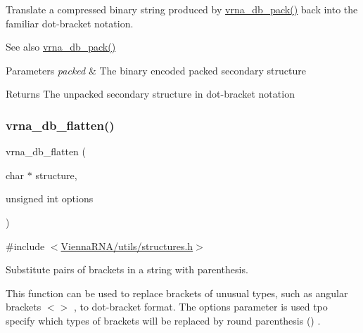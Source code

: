 Translate a compressed binary string produced by \hyperlink{group__struct__utils__dot__bracket_ga55c4783060a1464f862f858d5599c9e1}{vrna\+\_\+db\+\_\+pack()} back into the familiar dot-\/bracket notation.

\begin{DoxySeeAlso}{See also}
\hyperlink{group__struct__utils__dot__bracket_ga55c4783060a1464f862f858d5599c9e1}{vrna\+\_\+db\+\_\+pack()} 
\end{DoxySeeAlso}

\begin{DoxyParams}{Parameters}
{\em packed} & The binary encoded packed secondary structure \\
\hline
\end{DoxyParams}
\begin{DoxyReturn}{Returns}
The unpacked secondary structure in dot-\/bracket notation 
\end{DoxyReturn}
\mbox{\label{group__struct__utils__dot__bracket_gae966b9f44168a4f4b39ca42ffb5f37b7}} 
\subsubsection{\texorpdfstring{vrna\+\_\+db\+\_\+flatten()}{vrna\_db\_flatten()}}
{\footnotesize\ttfamily vrna\+\_\+db\+\_\+flatten (\begin{DoxyParamCaption}\item[{char $\ast$}]{structure,  }\item[{unsigned int}]{options }\end{DoxyParamCaption})}



{\ttfamily \#include $<$\hyperlink{utils_2structures_8h}{Vienna\+R\+N\+A/utils/structures.\+h}$>$}



Substitute pairs of brackets in a string with parenthesis. 

This function can be used to replace brackets of unusual types, such as angular brackets {\ttfamily $<$$>$} , to dot-\/bracket format. The {\ttfamily options} parameter is used tpo specify which types of brackets will be replaced by round parenthesis {\ttfamily }() .

